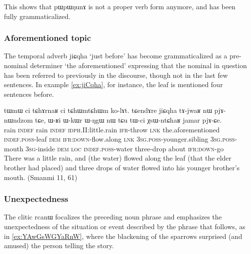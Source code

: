 \documentclass[oldfontcommands,oneside,a4paper,11pt]{article}
\newcommand{\ipa}[1]{\mbox{\phon #1}} %
\begin{document}
This shows that \ipa{pɯpɯŋunɤ} is not a proper verb form anymore, and has been fully grammaticalized.

\subsubsection{Aforementioned topic}
The temporal adverb \ipa{jiɕqha} `just before' has become grammaticalized as a pre-nominal determiner `the aforementioned' expressing that the nominal in question has been referred to previously in the discourse, though not in the last few sentences. In example \ref{ex:jiCqha}, for instance, the leaf is mentioned four sentences before.

\begin{exe}
\ex \label{ex:jiCqha}
 \gll \ipa{tɯmɯ} 	\ipa{ci} 	\ipa{tɕhɤrnaʁ} 	\ipa{ci} 	\ipa{tɕhɯmtɕhɯm} 	\ipa{ko-lɤt.} 	\ipa{tɕendɤre} 	\ipa{jiɕqha} 	\ipa{tɤ-jwaʁ} 	\ipa{nɯ} 	\ipa{pjɤ-nɯndzom} 	\ipa{tɕe,} 	\ipa{ɯ-ʁi} 	\ipa{ɯ-kɯr} 	\ipa{ɯ-ŋgɯ} 	\ipa{nɯ} 	\ipa{tɕu} 	\ipa{tɯ-ci} 	\ipa{χsɯ-ntɕhaʁ} 	\ipa{jamar} 	\ipa{pjɤ-ɕe.} \\
 rain \textsc{indef}  rain \textsc{indef} \textsc{idph}.II:little.rain \textsc{ifr}-throw \textsc{lnk} the.aforementioned \textsc{indef.poss}-leaf \textsc{dem} \textsc{ifr:down}-flow.along \textsc{lnk} \textsc{3sg.poss}-younger.sibling  \textsc{3sg.poss}-mouth \textsc{3sg}-inside \textsc{dem} \textsc{loc} \textsc{indef.poss}-water three-drop about \textsc{ifr:down}-go \\
 \glt There was a little rain, and (the water) flowed along the leaf (that the elder brother had placed) and three drops of water flowed into his younger brother's mouth. (Smanmi 11, 61)
\end{exe}

 \subsubsection{Unexpectedness}
The clitic \ipa{rcanɯ} focalizes the preceding noun phrase and emphasizes the unexpectedness of the situation or event described by the phrase that follows, as in \ref{ex:YAwGsWGYaRnW}, where the blackening of the sparrows surprised (and amused) the person telling the story.

\end{document}
